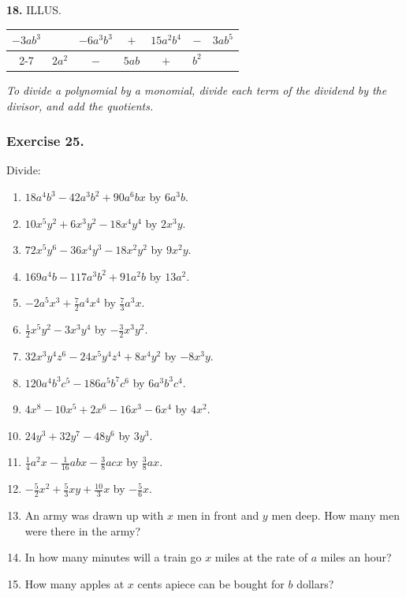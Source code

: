 \documentclass{book}
\begin{document}
\textbf{18.} ILLUS.
\begin{tabular}{c|cccccc}
$-3ab^{3}$ & &$-6a^{3}b^{3}$&$+$&$15a^{2}b^{4}$&$-$&$3ab^{5}$ \\
\cline{2-7}
\multicolumn{2}{c}{} &$2a^{2}$&$-$&$5ab$&$+$&$b^{2}$   \\
\end{tabular}

\textit{To divide a polynomial by a monomial, divide each
term of the dividend by the divisor, and add the
quotients.}

\begin{center}
\subsubsection*{Exercise 25.}
\end{center}

Divide:

\begin{enumerate}
\item $18a^{4}b^{3}-42a^{3}b^{2}+90a^{6}bx$ by $6a^{3}b$.

\item $10x^{5}y^{2}+6x^{3}y^{2}-18x^{4}y^{4}$ by $2x^{3}y$.

\item $72x^{5}y^{6}-36x^{4}y^{3}-18x^{2}y^{2}$ by $9x^{2}y$.

\item $169a^{4}b-117a^{3}b^{2}+91a^{2}b$ by $13a^{2}$.

\item $-2a^{5}x^{3}+\frac{7}{2}a^{4}x^{4}$ by $\frac{7}{3}a^{3}x$.

\item $\frac{1}{2}x^{5}y^{2}-3x^{3}y^{4}$ by $-\frac{3}{2}x^3y^{2}$.

\item $32x^{3}y^{4}z^{6}-24x^{5}y^{4}z^{4}+8x^{4}y^{2}$ by $-8x^{3}y$.

\item $120a^{4}b^{3}c^{5}-186a^{5}b^{7}c^{6}$ by $6a^{3}b^{3}c^{4}$.

\item $4x^{8}-10x^{5}+2x^{6}-16x^{3}-6x^{4}$ by $4x^{2}$.

\item $24y^{3}+32y^{7}-48y^{6}$ by $3y^{3}$.

\item $\frac{1}{4}a^2x-\frac{1}{16}abx - \frac{3}{8}acx$ by $\frac{3}{8}ax$.

\item $-\frac{5}{2}x^2+\frac{5}{3}xy+\frac{10}{3}x$ by $-\frac{5}{6}x$.

\item An army was drawn up with $x$ men in front and $y$
men deep. How many men were there in the army?

\item In how many minutes will a train go $x$ miles at
the rate of $a$ miles an hour?

\item How many apples at $x$ cents apiece can be bought
for $b$ dollars?
\end{enumerate}
\end{document}
